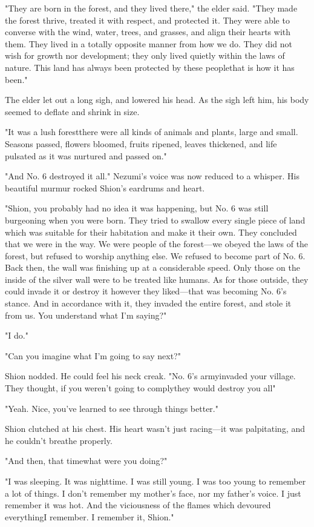 "They are born in the forest, and they lived there," the elder said.
"They made the forest thrive, treated it with respect, and protected it.
They were able to converse with the wind, water, trees, and grasses, and
align their hearts with them. They lived in a totally opposite manner
from how we do. They did not wish for growth nor development; they only
lived quietly within the laws of nature. This land has always been
protected by these people\el that is how it has been."

The elder let out a long sigh, and lowered his head. As the sigh left
him, his body seemed to deflate and shrink in size.

"It was a lush forest\el there were all kinds of animals and plants,
large and small. Seasons passed, flowers bloomed, fruits ripened, leaves
thickened, and life pulsated as it was nurtured and passed on."

"And No. 6 destroyed it all." Nezumi's voice was now reduced to a
whisper. His beautiful murmur rocked Shion's eardrums and heart.

"Shion, you probably had no idea it was happening, but No. 6 was still
burgeoning when you were born. They tried to swallow every single piece
of land which was suitable for their habitation and make it their own.
They concluded that we were in the way. We were people of the forest---we
obeyed the laws of the forest, but refused to worship anything else. We
refused to become part of No. 6. Back then, the wall was finishing up at
a considerable speed. Only those on the inside of the silver wall were
to be treated like humans. As for those outside, they could invade it or
destroy it however they liked---that was becoming No. 6's stance. And in
accordance with it, they invaded the entire forest, and stole it from
us. You understand what I'm saying?"

"I do."

"Can you imagine what I'm going to say next?"

Shion nodded. He could feel his neck creak. "No. 6's army\el invaded
your village. They thought, if you weren't going to comply\el they would
destroy you all\el "

"Yeah. Nice, you've learned to see through things better."

Shion clutched at his chest. His heart wasn't just racing---it was
palpitating, and he couldn't breathe properly.

"And then, that time\el what were you doing\el ?"

"I was sleeping. It was nighttime. I was still young. I was too young\el 
to remember a lot of things. I don't remember my mother's face, nor my
father's voice. I just remember it was hot. And the viciousness of the
flames which devoured everything\el I remember. I remember it, Shion."

